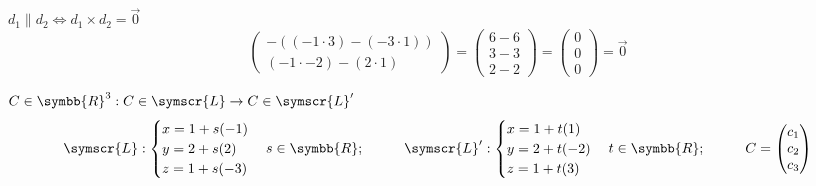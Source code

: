 \documentclass{article}
\def\fancyL{\symscr{L}}
\def\realR{\symbb{R}}
\begin{document}
\begin{enumerate}
\begin{itemize}
\begin{enumerate}[label=\listAlph]
\begin{mathcase}{\(d_1 \parallel d_2 \iff d_1 \times d_2 = \vec{0}\)}
\[\begin{pmatrix}
                                        -( (-1 \cdot 3) - (-3 \cdot 1) ) \\
                                        (-1 \cdot -2) - (2 \cdot 1)
                                    \end{pmatrix}
                                    =
                                    \begin{pmatrix}
                                        6 - 6 \\
                                        3 - 3 \\
                                        2 - 2 
                                    \end{pmatrix}
                                    = 
                                    \begin{pmatrix}
                                        0 \\ 0 \\ 0
                                    \end{pmatrix}
                                    = 
                                    \vec{0}
                            \]
                        \end{mathcase}
                        \begin{mathcase}{\(C \in \realR^3: C \in \fancyL \rightarrow C \in \fancyL'\)}
                            \[
                                \fancyL:
                                \begin{cases}
                                    x = 1 + s(-1) \\
                                    y = 2 + s(2) \\
                                    z = 1 + s(-3) 
                                \end{cases}
                                s \in \realR;
                                \hspace{1cm}
                                \fancyL': 
                                \begin{cases}
                                    x = 1 + t(1) \\
                                    y = 2 + t(-2) \\
                                    z = 1 + t(3)
                                \end{cases}
                                t \in \realR;
                                \hspace{1cm}
                                C = \begin{pmatrix}c_1 \\ c_2 \\ c_3\end{pmatrix}
\]
\end{mathcase}
\end{enumerate}
\end{itemize}
\end{enumerate}
\end{document}
